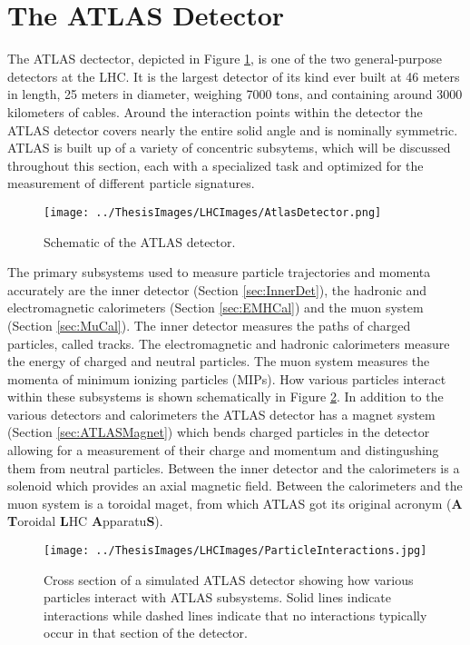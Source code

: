 \section{The ATLAS Detector}
\label{sec:ATLAS}
The ATLAS dectector, depicted in Figure \ref{fig:ATLASOverview}, is one of the two general-purpose detectors at the LHC.  It is the largest detector of its kind ever built at 46 meters in length, 25 meters in diameter, weighing 7000 tons, and containing around 3000 kilometers of cables\cite{ATLAS}.  Around the interaction points within the detector the ATLAS detector covers nearly the entire solid angle and is nominally symmetric.  ATLAS is built up of a variety of concentric subsytems, which will be discussed throughout this section, each with a specialized task and optimized for the measurement of different particle signatures.  
\begin{figure}[h!]
	\centering
	\texttt{[image: ../ThesisImages/LHCImages/AtlasDetector.png]}
	\caption[Schematic of the ATLAS detector.]{Schematic of the ATLAS detector.\cite{ATLAS}
	}
	\label{fig:ATLASOverview}
\end{figure}
The primary subsystems used to measure particle trajectories and momenta accurately are the inner detector (Section \ref{sec:InnerDet}), the hadronic and electromagnetic calorimeters (Section \ref{sec:EMHCal}) and the muon system (Section \ref{sec:MuCal}).  The inner detector measures the paths of charged particles, called tracks.  The electromagnetic and hadronic calorimeters measure the energy of charged and neutral particles. The muon system measures the momenta of minimum ionizing particles (MIPs).  How various particles interact within these subsystems is shown schematically in Figure \ref{fig:ATLASInteractions}.
In addition to the various detectors and calorimeters the ATLAS detector has a magnet system (Section \ref{sec:ATLASMagnet}) which bends charged particles in the detector allowing for a measurement of their charge and momentum and distingushing them from neutral particles.  Between the inner detector and the calorimeters is a solenoid which provides an axial magnetic field.  Between the calorimeters and the muon system is a toroidal maget, from which ATLAS got its original acronym (\textbf{A} \textbf{T}oroidal \textbf{L}HC \textbf{A}pparatu\textbf{S}).

\begin{figure}[h!]
	\centering
	\texttt{[image: ../ThesisImages/LHCImages/ParticleInteractions.jpg]}
	\caption[Cross section of a simulated ATLAS detector showing how various particles interact with ATLAS subsystems.]{Cross section of a simulated ATLAS detector showing how various particles interact with ATLAS subsystems.  Solid lines indicate interactions while dashed lines indicate that no interactions typically occur in that section of the detector. \cite{ParticleInteractions} 
	}
	\label{fig:ATLASInteractions}
\end{figure}


